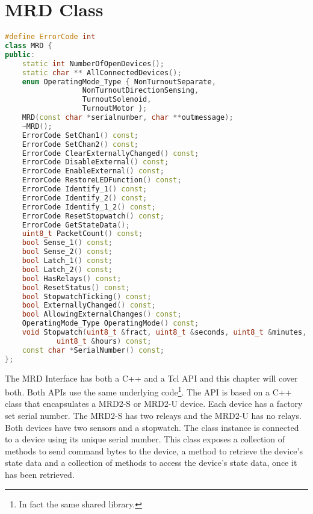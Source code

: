 \section{MRD Class}
\begin{lstlisting}[caption={MRD Class},
		   language=C++,label=lst:MRD:MRDClass]
#define ErrorCode int
class MRD {
public:
	static int NumberOfOpenDevices();
	static char ** AllConnectedDevices();
	enum OperatingMode_Type { NonTurnoutSeparate,
				  NonTurnoutDirectionSensing, 
				  TurnoutSolenoid, 
				  TurnoutMotor };
	MRD(const char *serialnumber, char **outmessage);
	~MRD();
	ErrorCode SetChan1() const;
	ErrorCode SetChan2() const;
	ErrorCode ClearExternallyChanged() const;
	ErrorCode DisableExternal() const;
	ErrorCode EnableExternal() const;
	ErrorCode RestoreLEDFunction() const;
	ErrorCode Identify_1() const;
	ErrorCode Identify_2() const;
	ErrorCode Identify_1_2() const;
	ErrorCode ResetStopwatch() const;
	ErrorCode GetStateData();
	uint8_t PacketCount() const;
	bool Sense_1() const;
	bool Sense_2() const;
	bool Latch_1() const;
	bool Latch_2() const;
	bool HasRelays() const;
	bool ResetStatus() const;
	bool StopwatchTicking() const;
	bool ExternallyChanged() const;
	bool AllowingExternalChanges() const;
	OperatingMode_Type OperatingMode() const;
	void Stopwatch(uint8_t &fract, uint8_t &seconds, uint8_t &minutes,
			uint8_t &hours) const;
	const char *SerialNumber() const;
};
\end{lstlisting}
The MRD Interface\cite{cxxinternals} has both a C++ and a Tcl API and
this chapter will cover both. Both APIs use the same underlying 
code\footnote{In fact the same shared library.}. The API is based on a
C++ class that encapsulates a MRD2-S or MRD2-U device.  Each device has a
factory set serial number.  The MRD2-S has two releays and the MRD2-U
has no relays.  Both devices have two sensors and a stopwatch. The class
instance is connected to a device using its unique serial number. This
class exposes a collection of methods to send command bytes to the
device, a method to retrieve the device's state data and a collection of
methods to access the device's state data, once it has been retrieved.

